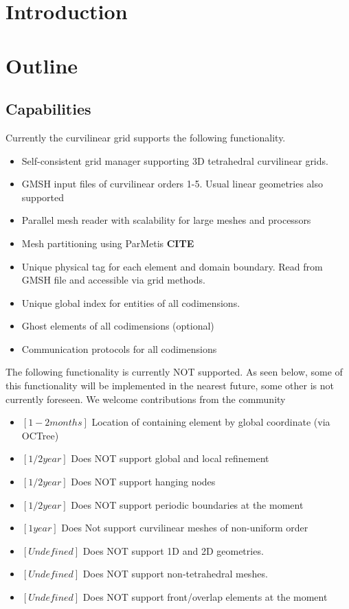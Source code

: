 \documentclass[12pt]{article}
\begin{document}
\section{Introduction}

\section{Outline}
\subsection{Capabilities}

\noindent
Currently the curvilinear grid supports the following functionality.
\begin{itemize}
	\item Self-consistent grid manager supporting 3D tetrahedral curvilinear grids.
	\item GMSH input files of curvilinear orders 1-5. Usual linear geometries also supported
	\item Parallel mesh reader with scalability for large meshes and processors
	\item Mesh partitioning using ParMetis \textbf{CITE}
	\item Unique physical tag for each element and domain boundary. Read from GMSH file and accessible via grid methods.
	\item Unique global index for entities of all codimensions.
	\item Ghost elements of all codimensions (optional)
	\item Communication protocols for all codimensions
\end{itemize}

\noindent
The following functionality is currently NOT supported. As seen below, some of this functionality will be implemented in the nearest future, some other is not currently foreseen. We welcome contributions from the community
\begin{itemize}
	\item $[1-2 months]$ Location of containing element by global coordinate (via OCTree)
	\item $[1/2 year]$  Does NOT support global and local refinement
	\item $[1/2 year]$  Does NOT support hanging nodes
	\item $[1/2 year]$  Does NOT support periodic boundaries at the moment
	\item $[1 year]$    Does Not support curvilinear meshes of non-uniform order
	\item $[Undefined]$ Does NOT support 1D and 2D geometries. 
	\item $[Undefined]$ Does NOT support non-tetrahedral meshes.
	\item $[Undefined]$ Does NOT support front/overlap elements at the moment
\end{itemize}
\end{document}
